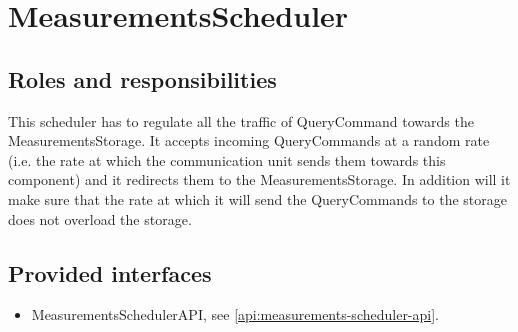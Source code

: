 \section{MeasurementsScheduler}
\label{element:measurements-scheduler}

\subsection{Roles and responsibilities}

\npar This scheduler has to regulate all the traffic of QueryCommand towards the
MeasurementsStorage. It accepts incoming QueryCommands at a random rate (i.e.
the rate at which the communication unit sends them towards this component) and
it redirects them to the MeasurementsStorage. In addition will it make sure that
the rate at which it will send the QueryCommands to the storage does not
overload the storage.

\subsection{Provided interfaces}

\begin{itemize}
  \item MeasurementsSchedulerAPI, see \ref{api:measurements-scheduler-api}.
\end{itemize}



